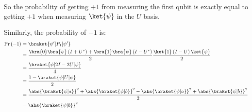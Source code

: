 %
So the probability of getting $+1$ from measuring the first qubit is exactly equal to getting $+1$ when measuring $\ket{\psi}$ in the $U$ basis.
%
\par Similarly, the probability of $-1$ is:
%
\begin{align*}
\pr{-1} &= \braket{\psi' | P_1 | \psi'} \\
&= \frac{\bra{0} \bra{\psi} \left( I + U^* \right) + \bra{1} \bra{\psi} \left( I - U^* \right )}{2} \frac{\ket{1} \left( I - U \right) \ket{\psi}}{2} \\
&= \frac{\braket{\psi | 2 I - 2 U | \psi}}{4} \\
&= \frac{1 - \braket{\psi | U | \psi}}{2} \\
&= \frac{\abs{\braket{\psi|a}}^2 + \abs{\braket{\psi|b}}^2 - \abs{\braket{\psi|a}}^2 + \abs{\braket{\psi|b}}^2}{2} \\
&= \abs{\braket{\psi|b}}^2
\end{align*}
\endgroup
